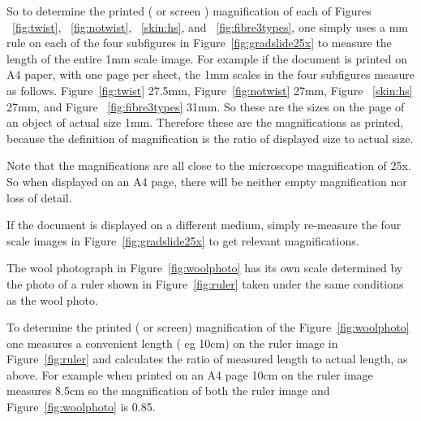 \documentclass[titlepage,10pt]{article}  %
\begin{document}


So to determine the printed ( or screen ) magnification of each of Figures ~\ref{fig:twist}, ~\ref{fig:notwist}, ~\ref{skin:hs}, and ~\ref{fig:fibre3types},  one simply uses a mm rule on each of the four subfigures in Figure~\ref{fig:gradslide25x} to measure the length of the entire 1mm scale image. For example if the document is printed on A4 paper, with one page per sheet, the 1mm scales in the four subfigures measure as follows. Figure~\ref{fig:twist} 27.5mm, Figure~\ref{fig:notwist} 27mm, Figure ~\ref{skin:hs} 27mm, and Figure ~\ref{fig:fibre3types} 31mm. So these are the sizes on the page of an object of actual size 1mm. Therefore these are the magnifications as printed, because the definition of magnification is the ratio of displayed size to actual size.

Note that the magnifications are all close to the microscope magnification of 25x. So when displayed on an A4 page, there will be neither empty magnification nor loss of detail.
 
If the document is displayed on a different medium, simply re-measure the four scale images in Figure~\ref{fig:gradslide25x} to get relevant magnifications.

The wool photograph in Figure~\ref{fig:woolphoto} has its own scale determined by the photo of a ruler shown in Figure~\ref{fig:ruler} taken under the same conditions as the wool photo.


To determine the printed ( or screen) magnification of the Figure~\ref{fig:woolphoto} one measures a convenient length ( eg 10cm) on the ruler image in Figure~\ref{fig:ruler} and calculates the ratio of measured length to actual length, as above. For example when printed on an A4 page 10cm on the ruler image measures 8.5cm so the magnification of both the ruler image and Figure~\ref{fig:woolphoto} is 0.85.
\end{document}
